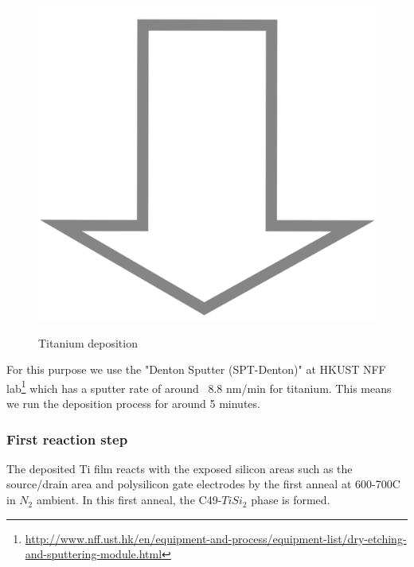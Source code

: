 \begin{figure}[H]
	\centering
	\begin{tikzpicture}[node distance = 3cm, auto, thick,scale=\CrossSectionOnly, every node/.style={transform shape}]
		
	\end{tikzpicture}\\
	\includegraphics[scale=0.01]{down_arrow.png}\\
	\begin{tikzpicture}[node distance = 3cm, auto, thick,scale=\CrossSectionOnly, every node/.style={transform shape}]
		
	\end{tikzpicture}
	\caption{Titanium deposition}
\end{figure}

For this purpose we use the "Denton Sputter (SPT-Denton)" at HKUST NFF lab\footnote{\url{http://www.nff.ust.hk/en/equipment-and-process/equipment-list/dry-etching-and-sputtering-module.html}} which has a sputter rate of around ~8.8 nm/min for titanium.
This means we run the deposition process for around 5 minutes.

\subsubsection{First reaction step}

The deposited Ti film reacts with the exposed silicon areas such as the source/drain area and polysilicon gate electrodes by the first anneal at 600-700\degree C in $N_2$ ambient.
In this first anneal, the C49-$TiSi_2$ phase is formed.

